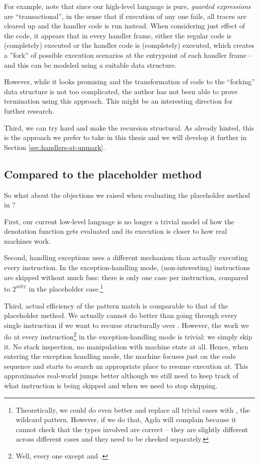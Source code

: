 For example, note that since our high-level language is pure,
\emph{guarded expressions} are
``transactional'', in the sense that if execution of any one fails, all traces
are cleared up and the handler code is run instead. When considering just
effect of the code, it appears that in every handler frame, either the regular
code is (completely) executed or the handler code is (completely) executed,
which creates a ''fork'' of possible execution scenarios at the entrypoint of
each handler frame -- and this can be modeled using a suitable data structure.
\label{sec:forks}

However, while it looks promising and the transformation of code to the
``forking'' data structure is not too complicated, the author has not been able
to prove termination using this approach. This might be an interesting direction
for further research.

Third, we can try hard and make the recursion structural. As already hinted,
this is the approach we prefer to take in this thesis and we will develop it
further in Section \ref{sec:handlers-at-unmark}.

\subsection{Compared to the placeholder method}

So what about the objections we raised when evaluating the placeholder method
in ?

First, our current low-level language is no longer a trivial model of how the
denotation function  gets evaluated and its execution is closer
to how real machines work.

Second, handling exceptions uses a different mechanism than actually executing
every instruction. In the exception-handling mode, (non-interesting)
instructions are skipped without much fuss: there is only one case per
instruction, compared to $2^\mathrm{arity}$ in the placeholder
case.\footnote{Theoretically, we could do even better and replace all trivial
cases with \ident{\_}, the wildcard pattern. However, if we do that, Agda will
complain because it cannot check that the types involved are correct
-- they are slightly different across different cases and they need to be
checked separately.}

Third, actual efficiency of the pattern match is comparable to that of the
placeholder method. We actually cannot do better than going through every
single instruction if we want to recurse structurally over .
However, the work we do at every instruction\footnote{Well, every one
except  and .} in the exception-handling mode is
trivial: we simply skip it. No stack inspection, no manipulation with machine
state at all.  Hence, when entering the exception handling mode, the machine
focuses just on the code sequence and starts to search an appropriate place to
resume execution at. This approximates real-world jumps better although we still
need to keep track of what instruction is being skipped and when we need to
stop skipping.

